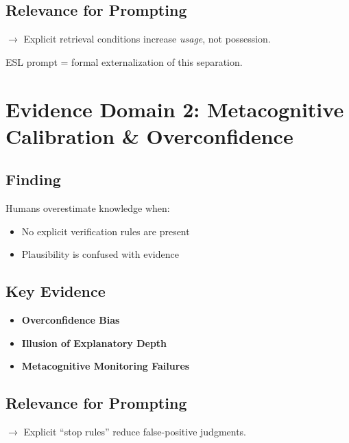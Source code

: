 \documentclass[11pt,a4paper]{article}
\begin{document}
\subsection{Relevance for Prompting}

$\rightarrow$ Explicit retrieval conditions increase \emph{usage}, not possession.

\begin{keypoint}
ESL prompt = formal externalization of this separation.
\end{keypoint}


\section{Evidence Domain 2: Metacognitive Calibration \& Overconfidence}

\subsection{Finding}

Humans overestimate knowledge when:
\begin{itemize}
    \item No explicit verification rules are present
    \item Plausibility is confused with evidence
\end{itemize}

\subsection{Key Evidence}

\begin{itemize}
    \item \textbf{Overconfidence Bias} \citep{fischhoff1977knowing}
    \item \textbf{Illusion of Explanatory Depth} \citep{rozenblit2002misunderstood}
    \item \textbf{Metacognitive Monitoring Failures}
\end{itemize}

\subsection{Relevance for Prompting}

$\rightarrow$ Explicit ``stop rules'' reduce false-positive judgments.
\end{document}

